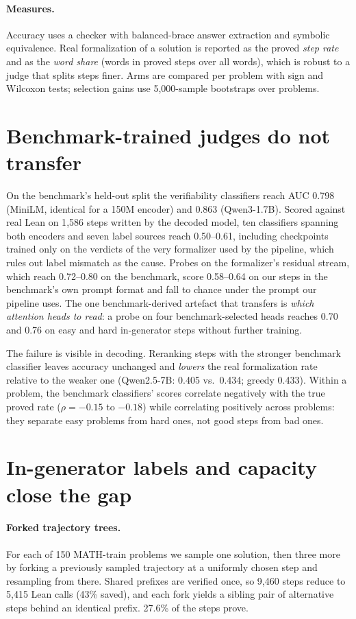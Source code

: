\documentclass[10pt]{article}
\begin{document}
\paragraph{Measures.} Accuracy uses a checker with balanced-brace answer extraction and symbolic equivalence. Real formalization of a solution is reported as the proved \emph{step rate} and as the \emph{word share} (words in proved steps over all words), which is robust to a judge that splits steps finer. Arms are compared per problem with sign and Wilcoxon tests; selection gains use 5{,}000-sample bootstraps over problems.

\section{Benchmark-trained judges do not transfer}\label{sec:transfer}

On the benchmark's held-out split the verifiability classifiers reach AUC 0.798 (MiniLM, identical for a 150M encoder) and 0.863 (Qwen3-1.7B). Scored against real Lean on 1{,}586 steps written by the decoded model, ten classifiers spanning both encoders and seven label sources reach 0.50--0.61, including checkpoints trained only on the verdicts of the very formalizer used by the pipeline, which rules out label mismatch as the cause. Probes on the formalizer's residual stream, which reach 0.72--0.80 on the benchmark, score 0.58--0.64 on our steps in the benchmark's own prompt format and fall to chance under the prompt our pipeline uses. The one benchmark-derived artefact that transfers is \emph{which attention heads to read}: a probe on four benchmark-selected heads reaches 0.70 and 0.76 on easy and hard in-generator steps without further training.

The failure is visible in decoding. Reranking steps with the stronger benchmark classifier leaves accuracy unchanged and \emph{lowers} the real formalization rate relative to the weaker one (Qwen2.5-7B: 0.405 vs.\ 0.434; greedy 0.433). Within a problem, the benchmark classifiers' scores correlate negatively with the true proved rate ($\rho=-0.15$ to $-0.18$) while correlating positively across problems: they separate easy problems from hard ones, not good steps from bad ones.

\section{In-generator labels and capacity close the gap}\label{sec:ingen}

\paragraph{Forked trajectory trees.} For each of 150 MATH-train problems we sample one solution, then three more by forking a previously sampled trajectory at a uniformly chosen step and resampling from there. Shared prefixes are verified once, so 9{,}460 steps reduce to 5{,}415 Lean calls (43\% saved), and each fork yields a sibling pair of alternative steps behind an identical prefix. 27.6\% of the steps prove.
\end{document}
